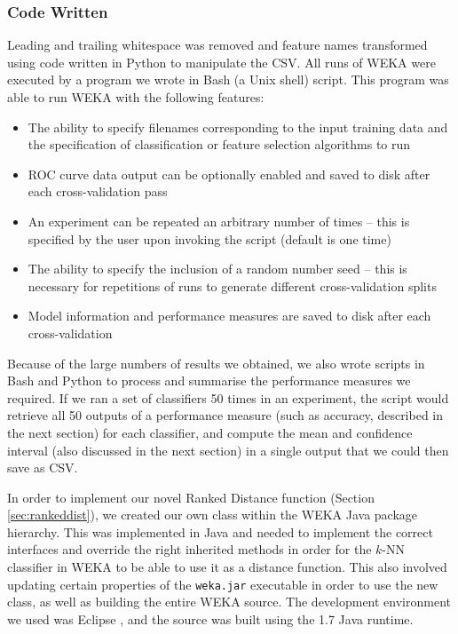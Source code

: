 \subsubsection{Code Written}
\label{sec:code}
Leading and trailing whitespace was removed and feature names transformed using
code written in Python to manipulate the CSV. All runs of WEKA were executed by
a program we wrote in Bash (a Unix shell) script. This program was able to run
WEKA with the following features:
\begin{itemize}
\item The ability to specify filenames corresponding to the input training data
and the specification of classification or feature selection algorithms to run
\item ROC curve data output can be optionally enabled and saved to disk after
each cross-validation pass
\item An experiment can be repeated an arbitrary number of times -- this is
specified by the user upon invoking the script (default is one time)
\item The ability to specify the inclusion of a random number seed -- this is
necessary for repetitions of runs to generate different cross-validation splits
\item Model information and performance measures are saved to disk after each
cross-validation
\end{itemize}

Because of the large numbers of results we obtained, we also wrote scripts in
Bash and Python to process and summarise the performance measures we required.
If we ran a set of classifiers 50 times in an experiment, the script would
retrieve all 50 outputs of a performance measure (such as accuracy, described
in the next section) for each classifier, and compute the mean and confidence
interval (also discussed in the next section) in a single output that we could
then save as CSV.

In order to implement our novel Ranked Distance function (Section
\ref{sec:rankeddist}), we created our own class within the WEKA Java package
hierarchy. This was implemented in Java and needed to implement the correct
interfaces and override the right inherited methods in order for the $k$-NN
classifier in WEKA to be able to use it as a distance function. This also
involved updating certain properties of the \texttt{weka.jar} executable in
order to use the new class, as well as building the entire WEKA source. The
development environment we used was Eclipse , and the
source was built using the 1.7 Java runtime. 


